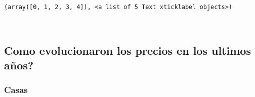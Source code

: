 \documentclass[11pt]{article}
\newcommand{\prompt}[4]{
        \llap{{\color{#2}[#3]: #4}}\vspace{-1.25em}
    }
\begin{document}
            \begin{tcolorbox}[breakable, boxrule=.5pt, size=fbox, pad at break*=1mm, opacityfill=0]
\prompt{Out}{outcolor}{523}{\hspace{3.5pt}}
\begin{Verbatim}[commandchars=\\\{\}]
(array([0, 1, 2, 3, 4]), <a list of 5 Text xticklabel objects>)
\end{Verbatim}
\end{tcolorbox}
        
    \begin{center}
    \end{center}
    { \hspace*{\fill} \\}
    
    \subsection{Como evolucionaron los precios en los ultimos
años?}\label{como-evolucionaron-los-precios-en-los-ultimos-auxf1os}

\subsubsection{Casas}\label{casas}
\end{document}
